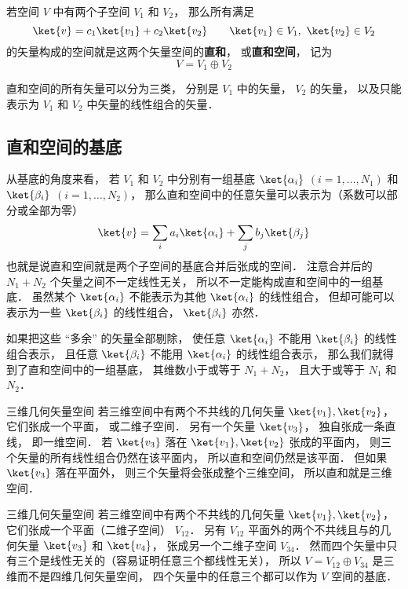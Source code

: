 

若空间 $V$ 中有两个子空间 $V_1$ 和 $V_2$， 那么所有满足
\begin{equation}
\ket{v} = c_1 \ket{v_1} + c_2 \ket{v_2}
\qquad
\ket{v_1} \in V_1,\ \ket{v_2} \in V_2
\end{equation}
的矢量构成的空间就是这两个矢量空间的\textbf{直和}， 或\textbf{直和空间}， 记为
\begin{equation}
V = V_1 \oplus V_2
\end{equation}

直和空间的所有矢量可以分为三类， 分别是 $V_1$ 中的矢量， $V_2$ 的矢量， 以及只能表示为 $V_1$ 和 $V_2$ 中矢量的线性组合的矢量．

\subsection{直和空间的基底}
从基底的角度来看， 若 $V_1$ 和 $V_2$ 中分别有一组基底 $\ket{\alpha_i}$ $(i = 1, \dots, N_1)$ 和 $\ket{\beta_i}$ $(i = 1, \dots, N_2)$， 那么直和空间中的任意矢量可以表示为（系数可以部分或全部为零）
\begin{equation}
\ket{v} = \sum_i a_i \ket{\alpha_i} + \sum_j b_j \ket{\beta_j}
\end{equation}
也就是说直和空间就是两个子空间的基底合并后张成的空间． 注意合并后的 $N_1 + N_2$ 个矢量之间不一定线性无关， 所以不一定能构成直和空间中的一组基底． 虽然某个 $\ket{\alpha_i}$ 不能表示为其他 $\ket{\alpha_i}$ 的线性组合， 但却可能可以表示为一些 $\ket{\beta_i}$ 的线性组合， $\ket{\beta_i}$ 亦然．

如果把这些 “多余” 的矢量全部剔除， 使任意 $\ket{\alpha_i}$ 不能用 $\ket{\beta_i}$ 的线性组合表示， 且任意 $\ket{\beta_i}$ 不能用 $\ket{\alpha_i}$ 的线性组合表示， 那么我们就得到了直和空间中的一组基底， 其维数小于或等于 $N_1 + N_2$， 且大于或等于 $N_1$ 和 $N_2$．

\begin{example}{三维几何矢量空间}\label{DirSum_ex1}
若三维空间中有两个不共线的几何矢量 $\ket{v_1}, \ket{v_2}$， 它们张成一个平面， 或二维子空间． 另有一个矢量 $\ket{v_3}$， 独自张成一条直线， 即一维空间． 若 $\ket{v_3}$ 落在 $\ket{v_1}, \ket{v_2}$ 张成的平面内， 则三个矢量的所有线性组合仍然在该平面内， 所以直和空间仍然是该平面． 但如果 $\ket{v_3}$ 落在平面外， 则三个矢量将会张成整个三维空间， 所以直和就是三维空间．
\end{example}

\begin{example}{三维几何矢量空间}\label{DirSum_ex2}
若三维空间中有两个不共线的几何矢量 $\ket{v_1}, \ket{v_2}$， 它们张成一个平面（二维子空间） $V_{12}$． 另有 $V_{12}$ 平面外的两个不共线且与的几何矢量 $\ket{v_3}$ 和 $\ket{v_4}$， 张成另一个二维子空间 $V_{34}$． 然而四个矢量中只有三个是线性无关的（容易证明任意三个都线性无关）， 所以 $V = V_{12} \oplus V_{34}$ 是三维而不是四维几何矢量空间， 四个矢量中的任意三个都可以作为 $V$ 空间的基底．
\end{example}

